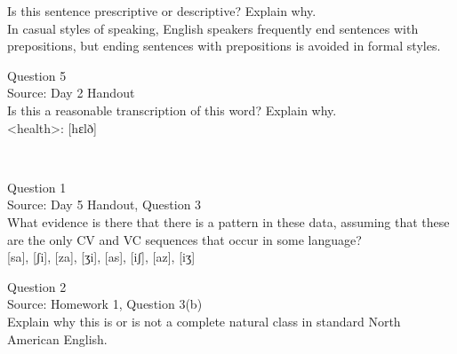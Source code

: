 \documentclass[12pt]{article}
\begin{document}
Is this sentence prescriptive or descriptive? Explain why.\\

In casual styles of speaking, English speakers frequently end sentences with prepositions, but ending sentences with prepositions is avoided in formal styles.


\newpage

{\large Question 5}\\

Source: Day 2 Handout\\

Is this a reasonable transcription of this word? Explain why.\\

<health>: {[hɛlð]}


\newpage

\begin{center}
\textbf{{\color{red}{\HUGE END OF EXAM}}}\\

\end{center}
\newpage

\begin{center}
\textbf{{\color{blue}{\HUGE START OF EXAM\\}}}

\textbf{{\color{blue}{\HUGE Student ID: 1715\\}}}

\textbf{{\color{blue}{\HUGE 1:30 - 1:45 PM\\}}}

\end{center}
\newpage

{\large Question 1}\\

Source: Day 5 Handout, Question 3\\

What evidence is there that there is a pattern in these data, assuming that these are the only CV and VC sequences that occur in some language?\\

{[sa]}, {[ʃi]}, {[za]}, {[ʒi]}, {[as]}, {[iʃ]}, {[az]}, {[iʒ]}


\newpage

{\large Question 2}\\

Source: Homework 1, Question 3(b)\\

Explain why this is or is not a complete natural class in standard North American English.\\
\end{document}
